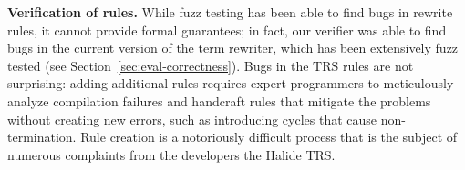 \documentclass[acmsmall,review,anonymous]{acmart}\settopmatter{printfolios=true,printccs=false,printacmref=false}
\begin{document}
\textbf{Verification of rules.} While fuzz testing has been able to find bugs in
rewrite rules, it cannot provide formal guarantees; in fact, our verifier was
able to find bugs in the current version of the term rewriter, which has been
extensively fuzz tested (see Section~\ref{sec:eval-correctness}). Bugs in the
TRS rules are not surprising:  adding additional rules requires expert
programmers to meticulously analyze compilation failures and handcraft rules
that mitigate the problems without creating new errors, such as introducing
cycles that cause non-termination. Rule creation is a notoriously difficult
process that is the subject of numerous complaints from the developers the
Halide TRS.


%


\end{document}
